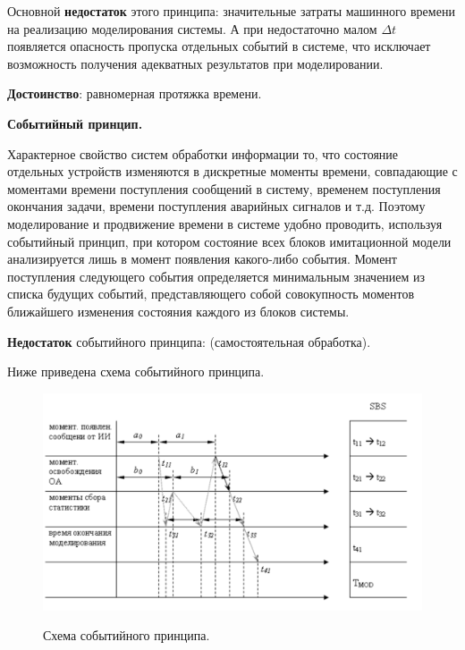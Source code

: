 \documentclass[a4paper,12pt]{article}
\begin{document}
	Основной {\bf недостаток} этого принципа: значительные затраты машинного времени на реализацию моделирования системы. А при недостаточно малом $\Delta t$ появляется опасность пропуска отдельных событий в системе, что исключает возможность получения адекватных результатов при моделировании.
	
	{\bf Достоинство}: равномерная протяжка времени.
	
	{\bf Событийный принцип.}
	
	Характерное свойство систем обработки информации то, что состояние отдельных устройств изменяются в дискретные моменты времени, совпадающие с моментами времени поступления сообщений в систему, временем поступления окончания задачи, времени поступления аварийных сигналов и т.д. Поэтому моделирование и продвижение времени в системе удобно проводить, используя событийный принцип, при котором состояние всех блоков имитационной модели анализируется лишь в момент появления какого-либо события. Момент поступления следующего события определяется минимальным значением из списка будущих событий, представляющего собой совокупность моментов ближайшего изменения состояния каждого из блоков системы. 
	
	{\bf Недостаток} событийного принципа: (самостоятельная обработка).
	
	\newpage
	
	Ниже приведена схема событийного принципа.
	
	\begin{figure}[h!]
		\begin{center}
			{\includegraphics[scale = 0.6]{sob.png}}
			\label{ris:sob}
		\end{center}
		\caption{Схема событийного принципа.}
	\end{figure}
\end{document}
